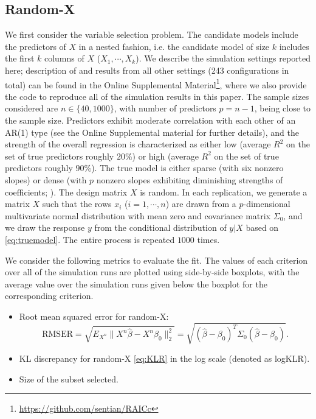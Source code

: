 \subsection{Random-X}
We first consider the variable selection problem. The candidate models include the predictors of $X$ in a nested fashion, i.e. the candidate model of size $k$ includes the first $k$ columns of $X$ ($X_1,\cdots,X_k$). We describe the simulation settings reported here; description of and results from all other settings (243 configurations in total) can be found in the Online Supplemental Material\footnote{\url{https://github.com/sentian/RAICc}}, where we also provide the code to reproduce all of the simulation results in this paper. The sample sizes considered are $n\in\{40, 1000\}$, with number of predictors $p=n-1$, being close to the sample size. Predictors exhibit moderate correlation with each other of an AR(1) type (see the Online Supplemental material for further details), and the strength of the overall regression is characterized as either low (average $R^2$ on the set of true predictors roughly $20\%$) or high (average $R^2$ on the set of true predictors roughly $90\%$). The true model is either sparse (with six nonzero slopes) or dense (with $p$ nonzero slopes exhibiting diminishing strengths of coefficients; \citealp{Taddy2017}). The design matrix $X$ is random. In each replication, we generate a matrix $X$ such that the rows $x_i$ ($i=1,\cdots,n$) are drawn from a $p$-dimensional multivariate normal distribution with mean zero and covariance matrix $\Sigma_0$, and we draw the response $y$ from the conditional distribution of $y|X$ based on \eqref{eq:truemodel}. The entire process is repeated $1000$ times. 

We consider the following metrics to evaluate the fit. The values of each criterion over all of the simulation runs are plotted using side-by-side boxplots, with the average value over the simulation runs given below the boxplot for the corresponding criterion.
\begin{itemize}
  \item Root mean squared error for random-X:
  \begin{equation*}
    \text{RMSER} = \sqrt{ E_{X^n} \lVert X^n\hat\beta-X^n\beta_0 \rVert_2^2 } =  \sqrt{ (\hat{\beta}-\beta_0)^T \Sigma_0 (\hat{\beta}-\beta_0) }.
  \end{equation*} 

  \item KL discrepancy for random-X \eqref{eq:KLR} in the log scale (denoted as logKLR).

  \item Size of the subset selected.
\end{itemize}


